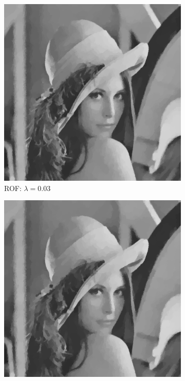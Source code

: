 \documentclass[abstracton]{scrreprt}
\begin{document}
\begin{figure}[!ht]
\begin{subfigure}[b]{0.244\textwidth}
                    \includegraphics[width=\textwidth]{img/denoising/gauss_noise/003lena.png}
                    \caption{ROF: $\lambda = 0.03$}
                \end{subfigure}
                \begin{subfigure}[b]{0.244\textwidth}
                    \includegraphics[width=\textwidth]{img/denoising/gauss_noise/07lena.png}

\end{subfigure}
\end{figure}
\end{document}
